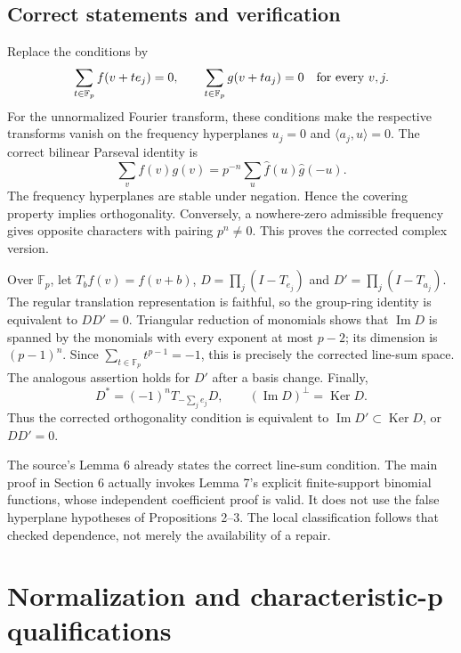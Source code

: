 \documentclass[10pt]{article}
\begin{document}
\subsection*{Correct statements and verification}
Replace the conditions by \[\sum_{t\in\mathbb F_p}f(v+te_j)=0,\qquad
 \sum_{t\in\mathbb F_p}g(v+ta_j)=0
 \quad\hbox{for every }v,j.\] For the unnormalized Fourier transform, these conditions make the respective transforms vanish on the frequency hyperplanes \(u_j=0\) and \(\langle a_j,u\rangle=0\). The correct bilinear Parseval identity is \[\sum_vf(v)g(v)=p^{-n}\sum_u\widehat f(u)\widehat g(-u).\] The frequency hyperplanes are stable under negation. Hence the covering property implies orthogonality. Conversely, a nowhere-zero admissible frequency gives opposite characters with pairing \(p^n\ne0\). This proves the corrected complex version.\par
Over \(\mathbb F_p\), let \(T_bf(v)=f(v+b)\), \(D=\prod_j(I-T_{e_j})\) and \(D'=\prod_j(I-T_{a_j})\). The regular translation representation is faithful, so the group-ring identity is equivalent to \(DD'=0\). Triangular reduction of monomials shows that \(\mathop{\mathrm{Im}}D\) is spanned by the monomials with every exponent at most \(p-2\); its dimension is \((p-1)^n\). Since \(\sum_{t\in\mathbb F_p}t^{p-1}=-1\), this is precisely the corrected line-sum space. The analogous assertion holds for \(D'\) after a basis change. Finally, \[D^*=(-1)^nT_{-\sum_j e_j}D,\qquad
 (\mathop{\mathrm{Im}}D)^\perp=\mathop{\mathrm{Ker}}D.\] Thus the corrected orthogonality condition is equivalent to \(\mathop{\mathrm{Im}}D'\subset\mathop{\mathrm{Ker}}D\), or \(DD'=0\).\par
The source’s Lemma 6 already states the correct line-sum condition. The main proof in Section 6 actually invokes Lemma 7’s explicit finite-support binomial functions, whose independent coefficient proof is valid. It does not use the false hyperplane hypotheses of Propositions 2–3. The local classification follows that checked dependence, not merely the availability of a repair.\par
\section*{Normalization and characteristic-p qualifications}
\end{document}
